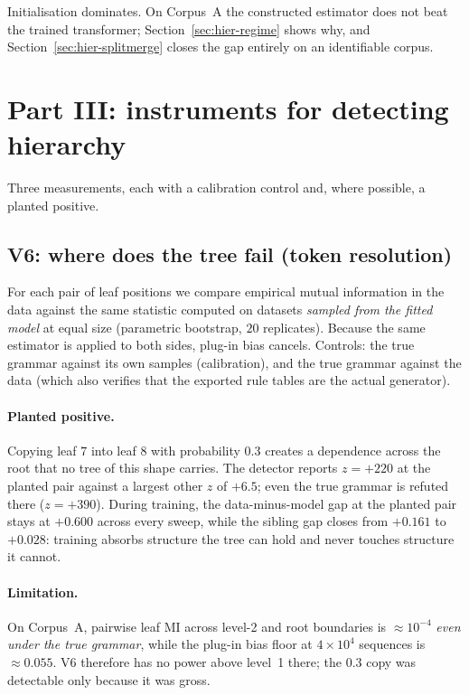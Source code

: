 \noindent
Initialisation dominates. On Corpus~A the constructed estimator does not beat
the trained transformer; Section~\ref{sec:hier-regime} shows why, and
Section~\ref{sec:hier-splitmerge} closes the gap entirely on an identifiable
corpus.

\section{Part III: instruments for detecting hierarchy}
\label{sec:hier-instruments}

Three measurements, each with a calibration control and, where possible, a
planted positive.

\subsection{V6: where does the tree fail (token resolution)}

For each pair of leaf positions we compare empirical mutual information in the
data against the same statistic computed on datasets \emph{sampled from the
fitted model} at equal size (parametric bootstrap, $20$ replicates). Because
the same estimator is applied to both sides, plug-in bias cancels. Controls:
the true grammar against its own samples (calibration), and the true grammar
against the data (which also verifies that the exported rule tables are the
actual generator).

\paragraph{Planted positive.}
Copying leaf $7$ into leaf $8$ with probability $0.3$ creates a dependence
across the root that no tree of this shape carries. The detector reports
$z=+220$ at the planted pair against a largest other $z$ of $+6.5$; even the
true grammar is refuted there ($z=+390$). During training, the data-minus-model
gap at the planted pair stays at $+0.600$ across every sweep, while the
sibling gap closes from $+0.161$ to $+0.028$: training absorbs structure the
tree can hold and never touches structure it cannot.

\paragraph{Limitation.}
On Corpus~A, pairwise leaf MI across level-2 and root boundaries is $\approx
10^{-4}$ \emph{even under the true grammar}, while the plug-in bias floor at
$4\times10^4$ sequences is $\approx 0.055$. V6 therefore has no power above
level~1 there; the $0.3$ copy was detectable only because it was gross.

